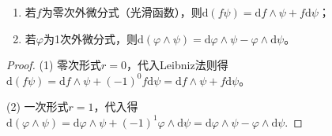 \documentclass[../../main.tex]{subfiles}%
\begin{document}
\begin{corollary}
\begin{enumerate}[(1)]
\item 若$f$为零次外微分式（光滑函数），则$\mathrm{d}(f\psi)=\mathrm{d}f\wedge\psi+f\mathrm{d}\psi$；
\item 若$\varphi$为1次外微分式，则$\mathrm{d}(\varphi\wedge\psi)=\mathrm{d}\varphi\wedge\psi-\varphi\wedge\mathrm{d}\psi$。
\end{enumerate}
\end{corollary}
\begin{proof}

(1) 零次形式$r=0$，代入Leibniz法则得$\mathrm{d}(f\psi)=\mathrm{d}f\wedge\psi+(-1)^0f\mathrm{d}\psi=\mathrm{d}f\wedge\psi+f\mathrm{d}\psi$。

(2) 一次形式$r=1$，代入得$\mathrm{d}(\varphi\wedge\psi)=\mathrm{d}\varphi\wedge\psi+(-1)^1\varphi\wedge\mathrm{d}\psi=\mathrm{d}\varphi\wedge\psi-\varphi\wedge\mathrm{d}\psi$.

\end{proof}
\end{document}
